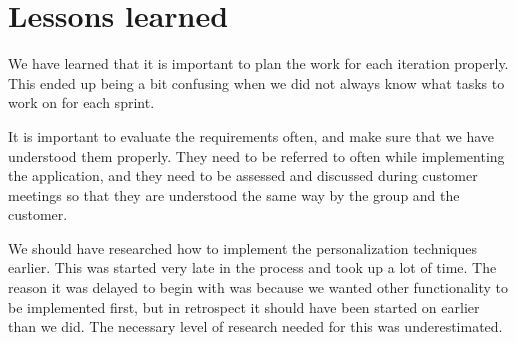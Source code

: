 \section{Lessons learned}

We have learned that it is important to plan the work for each iteration properly. This ended up being a bit confusing when we did not always know what tasks to work on for each sprint.\newline

It is important to evaluate the requirements often, and make sure that we have understood them properly. They need to be referred to often while implementing the application, and they need to be assessed and discussed during customer meetings so that they are understood the same way by the group and the customer.\newline

We should have researched how to implement the personalization techniques earlier. This was started very late in the process and took up a lot of time. The reason it was delayed to begin with was because we wanted other functionality to be implemented first, but in retrospect it should have been started on earlier than we did. The necessary level of research needed for this was underestimated.

\cleardoublepage